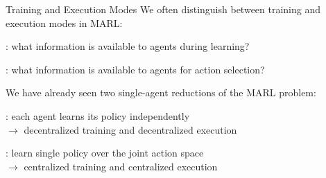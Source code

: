\begin{frame}[t]{Training and Execution Modes}
    We often distinguish between training and execution modes in MARL:
    \blist
        \item {}: what information is available to agents during learning?
        \item {}: what information is available to agents for action selection?
    \elist

    \vspace{-.5em}

    \pause

    \begin{reminderbox}
        We have already seen two single-agent reductions of the MARL problem:

        \blist
            \item<3-> : each agent learns its policy independently \\
                $\rightarrow$ decentralized training and decentralized execution
            \item<4-> : learn single policy over the joint action space \\
            	$\rightarrow$ centralized training and centralized execution
        \elist

        \vspace{-1em}
    \end{reminderbox}


\end{frame}

%
%
%
%

